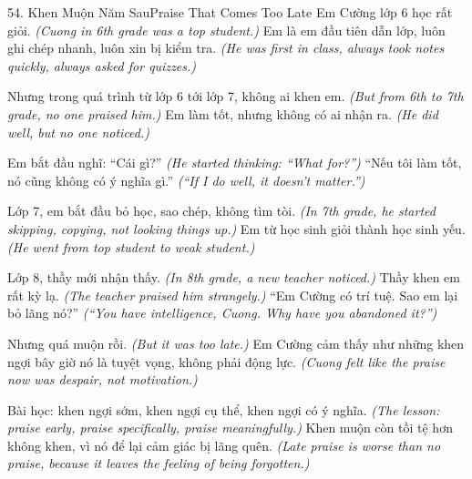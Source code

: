 \begin{truyen}{54. Khen Muộn Năm Sau}{Praise That Comes Too Late}
Em Cường lớp 6 học rất giỏi.
\textit{(Cuong in 6th grade was a top student.)}
Em là em đầu tiên dẫn lớp, luôn ghi chép nhanh, luôn xin bị kiểm tra.
\textit{(He was first in class, always took notes quickly, always asked for quizzes.)}

Nhưng trong quá trình từ lớp 6 tới lớp 7, không ai khen em.
\textit{(But from 6th to 7th grade, no one praised him.)}
Em làm tốt, nhưng không có ai nhận ra.
\textit{(He did well, but no one noticed.)}

Em bắt đầu nghĩ: ``Cái gì?''
\textit{(He started thinking: ``What for?'')}
``Nếu tôi làm tốt, nó cũng không có ý nghĩa gì.''
\textit{(``If I do well, it doesn't matter.'')}

Lớp 7, em bắt đầu bỏ học, sao chép, không tìm tòi.
\textit{(In 7th grade, he started skipping, copying, not looking things up.)}
Em từ học sinh giỏi thành học sinh yếu.
\textit{(He went from top student to weak student.)}

Lớp 8, thầy mới nhận thấy.
\textit{(In 8th grade, a new teacher noticed.)}
Thầy khen em rất kỳ lạ.
\textit{(The teacher praised him strangely.)}
``Em Cường có trí tuệ. Sao em lại bỏ lãng nó?''
\textit{(``You have intelligence, Cuong. Why have you abandoned it?'')}

Nhưng quá muộn rồi.
\textit{(But it was too late.)}
Em Cường cảm thấy như những khen ngợi bây giờ nó là tuyệt vọng, không phải động lực.
\textit{(Cuong felt like the praise now was despair, not motivation.)}

Bài học: khen ngợi sớm, khen ngợi cụ thể, khen ngợi có ý nghĩa.
\textit{(The lesson: praise early, praise specifically, praise meaningfully.)}
Khen muộn còn tồi tệ hơn không khen, vì nó để lại cảm giác bị lãng quên.
\textit{(Late praise is worse than no praise, because it leaves the feeling of being forgotten.)}
\end{truyen}

